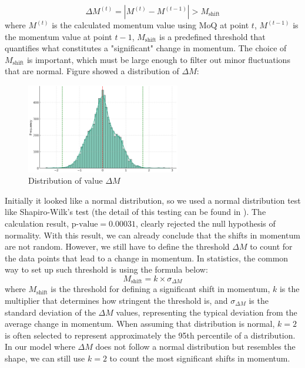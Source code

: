 \documentclass[12pt]{article}  %
\begin{document}
\[ \Delta M^{(t)} = | M^{(t)} - M^{(t-1)} | > M_{\text{shift}} \]
where \( M^{(t)} \) is the calculated momentum value using MoQ at point \( t \), \( M^{(t-1)} \) is the momentum value at point \( t-1 \), \( M_{\text{shift}} \) is a predefined threshold that quantifies what constitutes a "significant" change in momentum. The choice of \( M_{\text{shift}} \) is important, which must be large enough to filter out minor fluctuations that are normal. Figure showed a distribution of $\Delta M$:

 \begin{figure}[htbp]  %
 	\centering  %
 	\includegraphics[width=0.6\textwidth]{range.png} %
 	\caption{Distribution of value $\Delta M$} %
 \end{figure}
 \vspace{-0.2cm}
 
Initially it looked like a normal distribution, so we used a normal distribution test like Shapiro-Wilk's test (the detail of this testing can be found in \cite{15}). The calculation result, $\text{p-value} = 0.00031$, clearly rejected the null hypothesis of normality. With this result, we can already conclude that the shifts in momentum are not random. However, we still have to define the threshold $\Delta M$ to count for the data points that lead to a change in momentum. In statistics, the common way to set up such threshold is using the formula below:
\[ M_{\text{shift}} = k \times \sigma_{\Delta M} \]
where \( M_{\text{shift}} \) is the threshold for defining a significant shift in momentum, \( k \) is the multiplier that determines how stringent the threshold is, and \( \sigma_{\Delta M} \) is the standard deviation of the \( \Delta M \) values, representing the typical deviation from the average change in momentum. When assuming that distribution is normal, \( k = 2 \) is often selected to represent approximately the 95th percentile of a distribution. In our model where $\Delta M$ does not follow a normal distribution but resembles the shape, we can still use \( k = 2 \) to count the most significant shifts in momentum.
\end{document}
